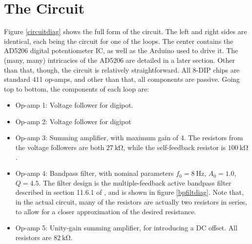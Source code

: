 \documentclass{article}
\begin{document}
    \section{The Circuit}

    Figure \ref{circuitdiag} shows the full form of the circuit. The left and right sides are identical, each being the circuit for one of the loops. The center contains the AD5206 digital potentiometer IC, as well as the Arduino used to drive it. The (many, many) intricacies of the AD5206 are detailed in a later section. Other than that, though, the circuit is relatively straightforward. All 8-DIP chips are standard 411 op-amps, and other than that, all components are passive. Going top to bottom, the components of each loop are:

    \begin{itemize}
        \item Op-amp 1: Voltage follower for digipot.
        \item Op-amp 2: Voltage follower for digipot
        \item Op-amp 3: Summing amplifier, with maximum gain of 4. The resistors from the voltage followers are both $\SI{27}{\kilo\ohm}$, while the self-feedback resistor is $\SI{100}{\kilo\ohm}$.
        \item Op-amp 4: Bandpass filter, with nominal parameters $f_0 = \SI{8}{\hertz}$, $A_0=1.0$, $Q=4.5$. The filter design is the multiple-feedback active bandpass filter described in section 11.6.1 of \cite{9780205083770}, and is shown in figure \ref{bpfiltdiag}. Note that, in the actual circuit, many of the resistors are actually two resistors in series, to allow for a closer approximation of the desired resistance.
        \item Op-amp 5: Unity-gain summing amplifier, for introducing a DC offset. All resistors are $\SI{82}{\kilo\ohm}$.
    \end{itemize}

    
\end{document}
